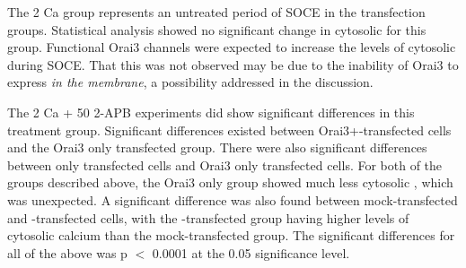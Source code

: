 The 2 Ca group represents an untreated period of SOCE in the transfection groups. Statistical analysis showed no significant change in cytosolic \Ca{} for this group. Functional Orai3 \Ca{} channels were expected to increase the levels of cytosolic \Ca{} during SOCE. 
That this was not observed may be due to the inability of Orai3 to express \emph{in the membrane}, a possibility addressed in the discussion. 



The 2 Ca + 50 2-APB experiments did show significant differences in this treatment group. 
Significant differences existed between Orai3+\stim{}-transfected cells and the Orai3 only transfected group. There were also significant differences between \stim{} only transfected cells and Orai3 only transfected cells. For both of the groups described above, the Orai3 only group showed much less cytosolic \Ca, which was unexpected. 
A significant difference was also found between mock-transfected and \stim{}-transfected cells, with the \stim{}-transfected group having higher levels of cytosolic calcium than the mock-transfected group.
The significant differences for all of the above was p $<$ 0.0001 at the 0.05 significance level. 


